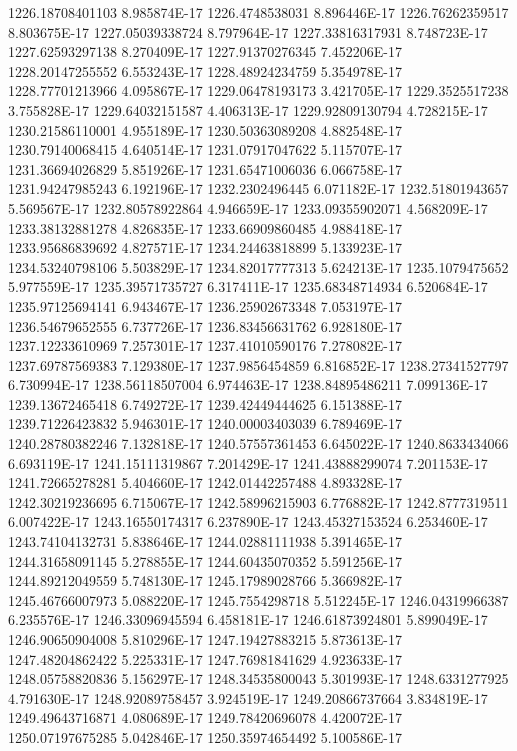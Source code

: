 1226.18708401103  8.985874E-17
1226.4748538031  8.896446E-17
1226.76262359517  8.803675E-17
1227.05039338724  8.797964E-17
1227.33816317931  8.748723E-17
1227.62593297138  8.270409E-17
1227.91370276345  7.452206E-17
1228.20147255552  6.553243E-17
1228.48924234759  5.354978E-17
1228.77701213966  4.095867E-17
1229.06478193173  3.421705E-17
1229.3525517238  3.755828E-17
1229.64032151587  4.406313E-17
1229.92809130794  4.728215E-17
1230.21586110001  4.955189E-17
1230.50363089208  4.882548E-17
1230.79140068415  4.640514E-17
1231.07917047622  5.115707E-17
1231.36694026829  5.851926E-17
1231.65471006036  6.066758E-17
1231.94247985243  6.192196E-17
1232.2302496445  6.071182E-17
1232.51801943657  5.569567E-17
1232.80578922864  4.946659E-17
1233.09355902071  4.568209E-17
1233.38132881278  4.826835E-17
1233.66909860485  4.988418E-17
1233.95686839692  4.827571E-17
1234.24463818899  5.133923E-17
1234.53240798106  5.503829E-17
1234.82017777313  5.624213E-17
1235.1079475652  5.977559E-17
1235.39571735727  6.317411E-17
1235.68348714934  6.520684E-17
1235.97125694141  6.943467E-17
1236.25902673348  7.053197E-17
1236.54679652555  6.737726E-17
1236.83456631762  6.928180E-17
1237.12233610969  7.257301E-17
1237.41010590176  7.278082E-17
1237.69787569383  7.129380E-17
1237.9856454859  6.816852E-17
1238.27341527797  6.730994E-17
1238.56118507004  6.974463E-17
1238.84895486211  7.099136E-17
1239.13672465418  6.749272E-17
1239.42449444625  6.151388E-17
1239.71226423832  5.946301E-17
1240.00003403039  6.789469E-17
1240.28780382246  7.132818E-17
1240.57557361453  6.645022E-17
1240.8633434066  6.693119E-17
1241.15111319867  7.201429E-17
1241.43888299074  7.201153E-17
1241.72665278281  5.404660E-17
1242.01442257488  4.893328E-17
1242.30219236695  6.715067E-17
1242.58996215903  6.776882E-17
1242.8777319511  6.007422E-17
1243.16550174317  6.237890E-17
1243.45327153524  6.253460E-17
1243.74104132731  5.838646E-17
1244.02881111938  5.391465E-17
1244.31658091145  5.278855E-17
1244.60435070352  5.591256E-17
1244.89212049559  5.748130E-17
1245.17989028766  5.366982E-17
1245.46766007973  5.088220E-17
1245.7554298718  5.512245E-17
1246.04319966387  6.235576E-17
1246.33096945594  6.458181E-17
1246.61873924801  5.899049E-17
1246.90650904008  5.810296E-17
1247.19427883215  5.873613E-17
1247.48204862422  5.225331E-17
1247.76981841629  4.923633E-17
1248.05758820836  5.156297E-17
1248.34535800043  5.301993E-17
1248.6331277925  4.791630E-17
1248.92089758457  3.924519E-17
1249.20866737664  3.834819E-17
1249.49643716871  4.080689E-17
1249.78420696078  4.420072E-17
1250.07197675285  5.042846E-17
1250.35974654492  5.100586E-17

